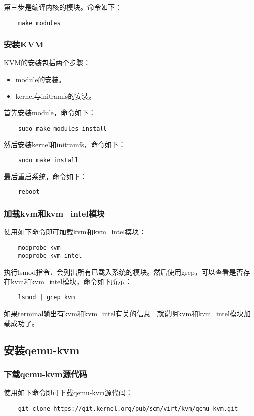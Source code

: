 \documentclass[a4paper,left=2.5cm,right=2.5cm,11pt]{article}
\begin{document}
	第三步是编译内核的模块。命令如下：
	\begin{lstlisting}
	make modules
	\end{lstlisting}

\subsubsection{安装KVM}
	KVM的安装包括两个步骤：
	\begin{itemize}
		\item module的安装。
		\item kernel与initramfs的安装。
	\end{itemize}

	首先安装module，命令如下：
	\begin{lstlisting}
	sudo make modules_install
	\end{lstlisting}

	然后安装kernel和initramfs，命令如下：
	\begin{lstlisting}
	sudo make install
	\end{lstlisting}

	最后重启系统，命令如下：
	\begin{lstlisting}
	reboot
	\end{lstlisting}

\subsubsection{加载kvm和kvm\_intel模块}
	使用如下命令即可加载kvm和kvm\_intel模块：
	\begin{lstlisting}
	modprobe kvm
	modprobe kvm_intel
	\end{lstlisting}

	执行lsmod指令，会列出所有已载入系统的模块。然后使用grep，可以查看是否存在kvm和kvm\_intel模块，命令如下所示：
	\begin{lstlisting}
	lsmod | grep kvm
	\end{lstlisting}

	如果terminal输出有kvm和kvm\_intel有关的信息，就说明kvm和kvm\_intel模块加载成功了。

\subsection{安装qemu-kvm}

\subsubsection{下载qemu-kvm源代码}
	使用如下命令即可下载qemu-kvm源代码：
	\begin{lstlisting}
	git clone https://git.kernel.org/pub/scm/virt/kvm/qemu-kvm.git
	\end{lstlisting}
\end{document}
